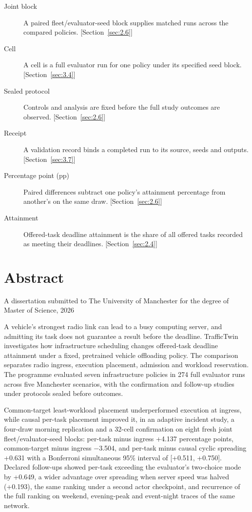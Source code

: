 \documentclass[12pt,a4paper]{article}
\begin{document}
{\begin{description}
\item[Joint block] A paired fleet/evaluator-seed block supplies matched runs across the compared policies. [Section~\ref{sec:2.6}]
\item[Cell] A cell is a full evaluator run for one policy under its specified seed block. [Section~\ref{sec:3.4}]
\item[Sealed protocol] Controls and analysis are fixed before the full study outcomes are observed. [Section~\ref{sec:2.6}]
\item[Receipt] A validation record binds a completed run to its source, seeds and outputs. [Section~\ref{sec:3.7}]
\item[Percentage point (pp)] Paired differences subtract one policy's attainment percentage from another's on the same draw. [Section~\ref{sec:2.6}]
\item[Attainment] Offered-task deadline attainment is the share of all offered tasks recorded as meeting their deadlines. [Section~\ref{sec:2.4}]
\end{description}
}
\clearpage
\onehalfspacing\RaggedRight
\section*{Abstract}\label{sec:abstract}
{\small A dissertation submitted to The University of Manchester for the degree of Master of Science, 2026\par}
\medskip

A vehicle's strongest radio link can lead to a busy computing server, and admitting its task does not guarantee a result before the deadline. TrafficTwin investigates how infrastructure scheduling changes offered-task deadline attainment under a fixed, pretrained vehicle offloading policy. The comparison separates radio ingress, execution placement, admission and workload reservation. The programme evaluated seven infrastructure policies in 274 full evaluator runs across five Manchester scenarios, with the confirmation and follow-up studies under protocols sealed before outcomes.

Common-target least-workload placement underperformed execution at ingress, while causal per-task placement improved it, in an adaptive incident study, a four-draw morning replication and a 32-cell confirmation on eight fresh joint fleet/evaluator-seed blocks: per-task minus ingress +4.137 percentage points, common-target minus ingress \ensuremath{-}3.504, and per-task minus causal cyclic spreading +0.631 with a Bonferroni simultaneous 95\% interval of [+0.511, +0.750]. Declared follow-ups showed per-task exceeding the evaluator's two-choice mode by +0.649, a wider advantage over spreading when server speed was halved (+0.193), the same ranking under a second actor checkpoint, and recurrence of the full ranking on weekend, evening-peak and event-night traces of the same network.
\end{document}
